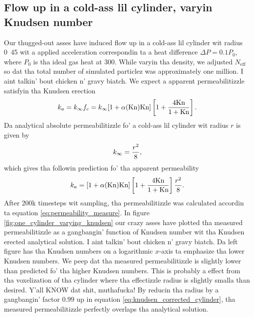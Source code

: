 \subsection{Flow up in a cold-ass lil cylinder, varyin Knudsen number}
Our thugged-out asses have induced flow up in a cold-ass lil cylinder wit radius \unit{0.45}{\micro\meter} wit a applied acceleration correspondin ta a heat difference $\Delta P = 0.1P_0$, where $P_0$ is tha ideal gas heat at \unit{300}{\kelvin}. While varyin tha density, we adjusted $N_\text{eff}$ so dat tha total number of simulated particlez was approximately one million. I aint talkin' bout chicken n' gravy biatch. We expect a apparent permeabilitizzle satisfyin tha Knudsen erection
\begin{align}
    k_a = k_\infty f_c = k_\infty[1 + \alpha(\text{Kn})\text{Kn}]\left[1 + {4\text{Kn}\over 1 + \text{Kn}}\right].
\end{align}
Da analytical absolute permeabilitizzle fo' a cold-ass lil cylinder wit radius $r$ is given by\cite{karniadakis2005microflows}
\begin{align}
    \label{eq:permeability_cylinder}
    k_\infty = {r^2\over 8},
\end{align}
which gives tha followin prediction fo' tha apparent permeability
\begin{align}
    \label{eq:knudsen_corrected_cylinder}
    k_a = [1 + \alpha(\text{Kn})\text{Kn}]\left[1 + {4\text{Kn}\over 1 + \text{Kn}}\right] {r^2\over 8}.
\end{align}
After 200k timesteps wit sampling, tha permeabilitizzle was calculated accordin ta equation \ref{eq:permeability_measure}. In figure \ref{fig:one_cylinder_varying_knudsen} our crazy asses have plotted tha measured permeabilitizzle as a gangbangin' function of Knudsen number wit tha Knudsen erected analytical solution. I aint talkin' bout chicken n' gravy biatch. Da left figure has tha Knudsen numbers on a logarithmic $x$-axis ta emphasize tha lower Knudsen numbers. We peep dat tha measured permeabilitizzle is slightly lower than predicted fo' tha higher Knudsen numbers. This is probably a effect from tha voxelization of tha cylinder where tha effectizzle radius is slightly smalla than desired. Y'all KNOW dat shit, muthafucka! By reducin tha radius by a gangbangin' factor $0.99$ up in equation \eqref{eq:knudsen_corrected_cylinder}, tha measured permeabilitizzle perfectly overlaps tha analytical solution.

